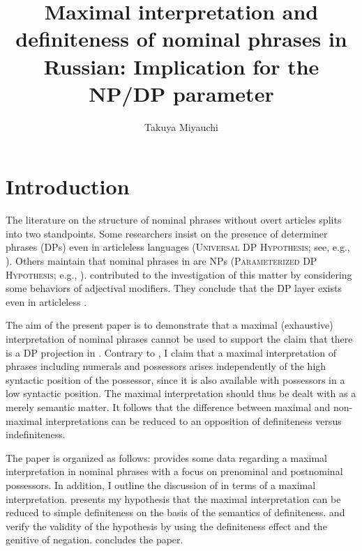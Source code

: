 \documentclass[output=paper,
colorlinks,
citecolor=brown,
newtxmath
]{langscibook}
\title{Maximal interpretation and definiteness of nominal phrases in Russian: Implication for the NP/DP parameter}
\author{%
Takuya Miyauchi\affiliation{The University of Tokyo}\orcid{0000-0003-4836-1617}}
\begin{document}
\maketitle

\section{Introduction}
The literature on the structure of  nominal phrases without overt articles splits into two standpoints. Some researchers insist on the presence of determiner phrases (DPs) even in articleless  languages (\textsc{Universal DP Hypothesis}; see, e.g., \citealt{Progovac1998,Rappaport2002,Rutkowski2002,Basic2004,Franks.Pereltsvaig2004, Pereltsvaig2007a,Rutkowski.Maliszewska2007}). Others maintain that nominal phrases in  are NPs (\textsc{Parameterized DP Hypo\-thesis}; e.g., \citealt{Zlatic1998,Trenkic2004,Boskovic2005,Boskovic2007,Boskovic2009,Despic2013}). \citet{Kagan.Pereltsvaig2012} contributed to the investigation of this matter by considering some behaviors of adjectival modifiers. They conclude that the DP layer exists even in articleless .


The aim of the present paper is to demonstrate that a maximal (exhaustive) interpretation of nominal phrases cannot be used to support the claim that there is a DP projection in . Contrary to \citet{Kagan.Pereltsvaig2012}, I claim that a maximal interpretation of phrases including numerals and possessors arises independently of the high syntactic position of the possessor, since it is also available with possessors in a low syntactic position. The maximal interpretation should thus be dealt with as a merely semantic matter. It follows that the difference between maximal and non-maximal interpretations can be reduced to an opposition of definiteness versus indefiniteness.

The paper is organized as follows:  provides some data regarding a maximal interpretation in  nominal phrases with a focus on prenominal and postnominal possessors. In addition, I outline the discussion of \citet{Kagan.Pereltsvaig2012} in terms of a maximal interpretation.  presents my hypothesis that the maximal interpretation can be reduced to simple definiteness on the basis of the semantics of definiteness.  and  verify the validity of the hypothesis by using the definiteness effect and the genitive of negation.  concludes the paper.
\end{document}
